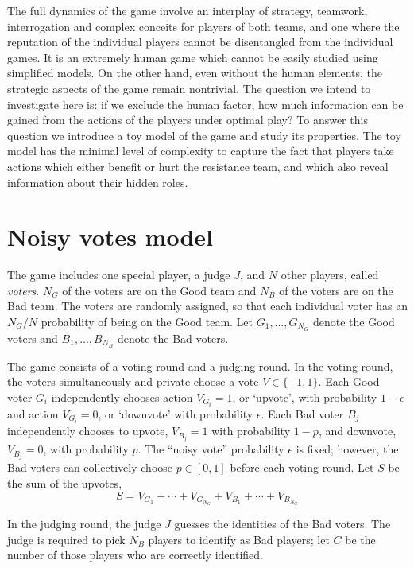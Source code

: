 \documentclass[11pt]{article}
\begin{document}
The full dynamics of the game involve an interplay of strategy,
teamwork, interrogation and complex conceits for players of both
teams, and one where the reputation of the individual players cannot
be disentangled from the individual games.  It is an extremely human
game which cannot be easily studied using simplified models.  On the
other hand, even without the human elements, the strategic aspects of
the game remain nontrivial.  The question we intend to investigate
here is: if we exclude the human factor, how much information can be
gained from the actions of the players under optimal play?  To answer
this question we introduce a toy model of the game and study its
properties.  The toy model has the minimal level of complexity to
capture the fact that players take actions which either benefit or
hurt the resistance team, and which also reveal information about
their hidden roles.

\section{Noisy votes model}

The game includes one special player, a judge $J$, and $N$ other
players, called \emph{voters}.  $N_G$ of the voters are on the Good
team and $N_B$ of the voters are on the Bad team.  The voters are
randomly assigned, so that each individual voter has an $N_G/N$
probability of being on the Good team.  Let $G_1,\hdots, G_{N_G}$
denote the Good voters and $B_1,\hdots,B_{N_B}$ denote the Bad voters.

The game consists of a voting round and a judging round.  In the
voting round, the voters simultaneously and private choose a vote $V
\in \{-1, 1\}$. Each Good voter $G_i$ independently chooses action
$V_{G_i}=1$, or `upvote', with probability $1-\epsilon$ and action
$V_{G_i}=0$, or `downvote' with probability $\epsilon$.  Each Bad
voter $B_j$ independently chooses to upvote, $V_{B_j}=1$ with
probability $1-p$, and downvote, $V_{B_j}=0$, with probability $p$.
The ``noisy vote'' probability $\epsilon$ is fixed; however, the Bad
voters can collectively choose $p \in [0,1]$ before each voting round.
Let $S$ be the sum of the upvotes,
\[
S =V_{G_1} + \cdots + V_{G_{N_G}} + V_{B_1} + \cdots + V_{B_{N_G}}
\]

In the judging round, the judge $J$ guesses the identities of the Bad
voters.  The judge is required to pick $N_B$ players to identify as
Bad players; let $C$ be the number of those players who are correctly
identified.
\end{document}
